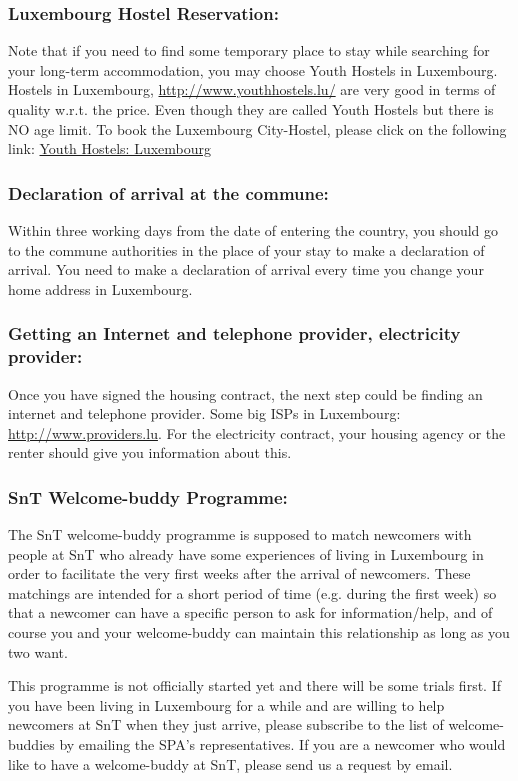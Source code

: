 \subsubsection{Luxembourg Hostel Reservation:} Note that if you need to find some temporary place to stay while searching for your long-term accommodation, you may choose Youth Hostels in Luxembourg. Hostels in Luxembourg, \url{http://www.youthhostels.lu/} are very good in terms of quality w.r.t. the price. Even though they are called Youth Hostels but there is NO age limit.
To book the Luxembourg City-Hostel, please click on the following link: \href{http://youthhostels.lu/en/youth-hostels/youth-hostel-luxembourg}{Youth Hostels: Luxembourg}

\subsubsection{Declaration of arrival at the commune: } Within three working days from the date of entering the country, you should go to the commune authorities in the place of your stay to make a declaration of arrival. 
You need to make a declaration of arrival every time you change your home address in Luxembourg. 

\subsubsection{Getting an Internet and telephone provider, electricity provider:} Once you have signed the housing contract, the next step could be finding an internet and telephone provider. 
Some big ISPs in Luxembourg: \url{http://www.providers.lu}. 
For the electricity contract, your housing agency or the renter should give you information about this. 

\subsubsection{SnT Welcome-buddy Programme:} The SnT welcome-buddy programme is supposed to match newcomers with people at SnT who already have some experiences of living in Luxembourg in order to facilitate the very first weeks after the arrival of newcomers. 
These matchings are intended for a short period of time (e.g. during the first week) so that a newcomer can have a specific person to ask for information/help, and of course you and your welcome-buddy can maintain this relationship as long as you two want. 

This programme is not officially started yet and there will be some trials first. 
If you have been living in Luxembourg for a while and are willing to help newcomers at SnT when they just arrive, please subscribe to the list of welcome-buddies by emailing the SPA's representatives. 
If you are a newcomer who would like to have a welcome-buddy at SnT, please send us a request by email. 


